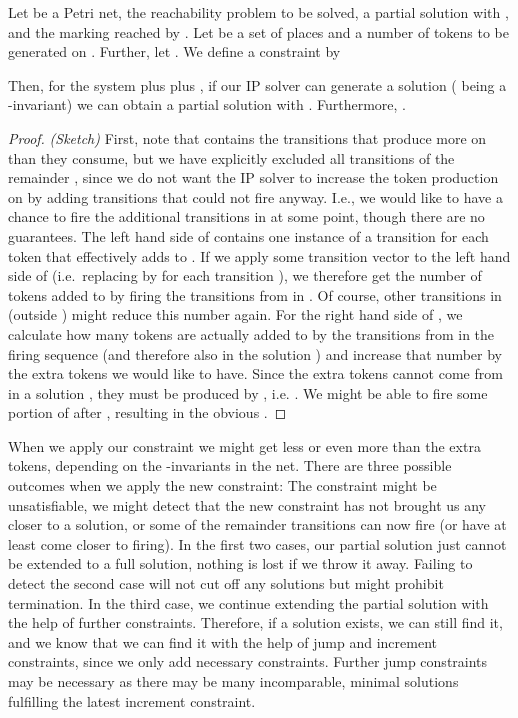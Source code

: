 \documentclass{LMCS}
\begin{document}
\begin{lem}\label{L.CON}
Let  be a Petri net,  the reachability problem to be solved,  a partial solution
with , and  the marking reached by .
Let  be a set of places and  a number of tokens to be generated on .
Further, let .
We define a constraint  by

Then, for the system  plus  plus , if our IP solver can generate a solution  ( being a -invariant) 
we can obtain a partial solution  with . Furthermore,
.
\end{lem}
\begin{proof} {\em (Sketch)}
First, note that  contains the transitions that produce more on  than they consume, but we have explicitly excluded
all transitions of the remainder , since we do not want the IP solver to increase the token production on  by adding
transitions that could not fire anyway. I.e., we would like to have a chance to fire the additional transitions in  at
some point, though there are no guarantees. The left hand side of  contains one instance of a transition  for each
token that  effectively adds to . If we apply some transition vector  to the left hand side of  (i.e.\ 
replacing  by  for each transition ), we therefore
get the number of tokens added to  by firing the transitions from  in . Of course, other transitions in  (outside ) might
reduce this number again. For the right hand side of , we calculate how many tokens are actually added to  by the
transitions from  in the firing sequence  (and therefore also in the solution ) and increase that number by 
the  extra tokens we would like to have. Since the extra tokens cannot come from  in a solution , they must
be produced by , i.e. . We might be able to fire some portion of 
after , resulting in the obvious .
\end{proof}

When we apply our constraint we might get less or even more than the  extra tokens, depending on the -invariants in the net.
There are three possible outcomes when we apply the new constraint: The constraint might be unsatisfiable, we might detect
that the new constraint has not brought us any closer to a solution, or some of the remainder
transitions can now fire (or have at least come closer to firing). In the first two cases, our partial solution just cannot 
be extended to a full solution, nothing is lost if we throw it away. Failing to detect the second case will not cut off
any solutions but might prohibit termination. In the third case, we continue extending the partial
solution with the help of further constraints. Therefore, if a solution exists, we can still find it, and we know that we
can find it with the help of jump and increment constraints, since we only add necessary constraints. Further jump
constraints may be necessary as there may be many incomparable, minimal solutions fulfilling the latest increment constraint.
\end{document}
